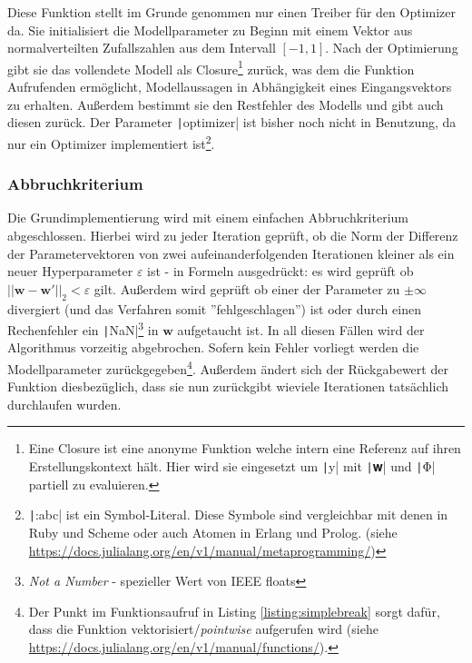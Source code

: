 \documentclass{article}
\theoremstyle{plain} %
\theoremstyle{definition} %
\begin{document}
Diese Funktion stellt im Grunde genommen nur einen Treiber für den Optimizer da. Sie initialisiert die Modellparameter zu Beginn mit einem Vektor aus normalverteilten Zufallszahlen\cite{Lippe} aus dem Intervall $[-1, 1]$. Nach der Optimierung gibt sie das vollendete Modell als Closure\footnote{Eine Closure ist eine anonyme Funktion welche intern eine Referenz auf ihren Erstellungskontext hält. Hier wird sie eingesetzt um \texttt|y| mit \texttt|𝐰| und \texttt|Φ| partiell zu evaluieren.} zurück, was dem die Funktion Aufrufenden ermöglicht, Modellaussagen in Abhängigkeit eines Eingangsvektors zu erhalten. Außerdem bestimmt sie den Restfehler des Modells und gibt auch diesen zurück. Der Parameter \texttt|optimizer| ist bisher noch nicht in Benutzung, da nur ein Optimizer implementiert ist\footnote{\texttt|:abc| ist ein Symbol-Literal. Diese Symbole sind vergleichbar mit denen in Ruby und Scheme oder auch Atomen in Erlang und Prolog. (siehe \url{https://docs.julialang.org/en/v1/manual/metaprogramming/})}.

\subsubsection{Abbruchkriterium}

Die Grundimplementierung wird mit einem einfachen Abbruchkriterium abgeschlossen. Hierbei wird zu jeder Iteration geprüft, ob die Norm der Differenz der Parametervektoren von zwei aufeinanderfolgenden Iterationen kleiner als ein neuer Hyperparameter $\varepsilon$ ist - in Formeln ausgedrückt: es wird geprüft ob $||\mathbf{w} - \mathbf{w}'||_2 < \varepsilon$ gilt.
Außerdem wird geprüft ob einer der Parameter zu $\pm\infty$ divergiert (und das Verfahren somit ''fehlgeschlagen'') ist oder durch einen Rechenfehler ein \texttt|NaN|\footnote{\emph{Not a Number} - spezieller Wert von IEEE floats} in $\mathbf{w}$ aufgetaucht ist. In all diesen Fällen wird der Algorithmus vorzeitig abgebrochen. Sofern kein Fehler vorliegt werden die Modellparameter zurückgegeben\footnote{Der Punkt im Funktionsaufruf in Listing \ref{listing:simplebreak} sorgt dafür, dass die Funktion vektorisiert/\emph{pointwise} aufgerufen wird (siehe \url{https://docs.julialang.org/en/v1/manual/functions/}).}. Außerdem ändert sich der Rückgabewert der Funktion diesbezüglich, dass sie nun zurückgibt wieviele Iterationen tatsächlich durchlaufen wurden.
\end{document}
